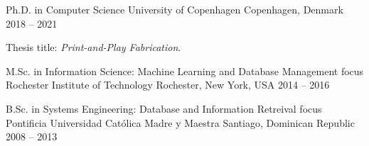 
\begin{cventries}

  \cventry
    {Ph.D. in Computer Science}
    {University of Copenhagen}
    {Copenhagen, Denmark}
    {2018 -- 2021}
    {
      \begin{cvitems}
        \item Thesis title: \emph{Print-and-Play Fabrication}. 
      \end{cvitems}
      \vspace{1em}
    }
    
  \cventry
    {M.Sc. in Information Science: Machine Learning and Database Management focus}
    {Rochester Institute of Technology}
    {Rochester, New York, USA}
    {2014 -- 2016}
    {
    }

  \cventry
    {B.Sc. in Systems Engineering: Database and Information Retreival focus}
    {Pontificia Universidad Cat\'olica Madre y Maestra}
    {Santiago, Dominican Republic}
    {2008 -- 2013}
    {
    }

\end{cventries}

